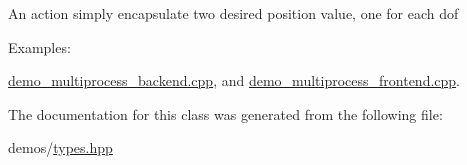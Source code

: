 An action simply encapsulate two desired position value, one for each dof \begin{Desc}
\item[Examples\+: ]\par
\hyperlink{demo_multiprocess_backend_8cpp-example}{demo\+\_\+multiprocess\+\_\+backend.\+cpp}, and \hyperlink{demo_multiprocess_frontend_8cpp-example}{demo\+\_\+multiprocess\+\_\+frontend.\+cpp}.\end{Desc}


The documentation for this class was generated from the following file\+:\begin{DoxyCompactItemize}
\item 
demos/\hyperlink{types_8hpp}{types.\+hpp}\end{DoxyCompactItemize}
